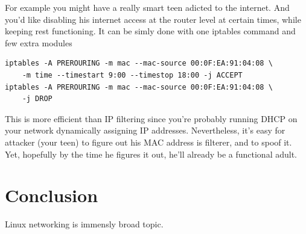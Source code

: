 \documentclass[times, utf8, seminar, english]{fer}
\begin{document}
For example you might have a really smart teen adicted to the internet.
And you'd like disabling his internet access at the router level at certain times, while keeping rest functioning.
It can be simly done with one iptables command and few extra modules

\begin{verbatim}
iptables -A PREROURING -m mac --mac-source 00:0F:EA:91:04:08 \
    -m time --timestart 9:00 --timestop 18:00 -j ACCEPT
iptables -A PREROURING -m mac --mac-source 00:0F:EA:91:04:08 \
    -j DROP
\end{verbatim}

This is more efficient than IP filtering since you're probably running DHCP on your network dynamically assigning IP addresses.
Nevertheless, it's easy for attacker (your teen) to figure out his MAC address is filterer, and to spoof it.
Yet, hopefully by the time he figures it out, he'll already be a functional adult.

\chapter{Conclusion}

Linux networking is immensly broad topic.




\end{document}
